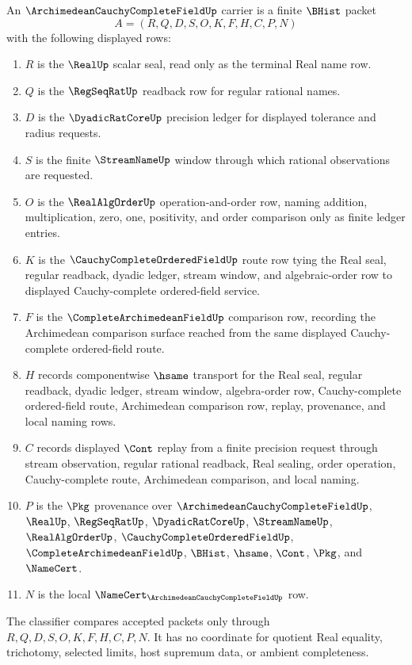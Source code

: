 \begin{definition}
\label{def:archimedean-cauchy-complete-field-carrier}
An $\ArchimedeanCauchyCompleteFieldUp$ carrier is a finite $\BHist$ packet
$$
A=(R,Q,D,S,O,K,F,H,C,P,N)
$$
with the following displayed rows:
\begin{enumerate}
\item $R$ is the $\RealUp$ scalar seal, read only as the terminal Real name row.
\item $Q$ is the $\RegSeqRatUp$ readback row for regular rational names.
\item $D$ is the $\DyadicRatCoreUp$ precision ledger for displayed tolerance and radius requests.
\item $S$ is the finite $\StreamNameUp$ window through which rational observations are requested.
\item $O$ is the $\RealAlgOrderUp$ operation-and-order row, naming addition, multiplication, zero, one, positivity, and order comparison only as finite ledger entries.
\item $K$ is the $\CauchyCompleteOrderedFieldUp$ route row tying the Real seal, regular readback, dyadic ledger, stream window, and algebraic-order row to displayed Cauchy-complete ordered-field service.
\item $F$ is the $\CompleteArchimedeanFieldUp$ comparison row, recording the Archimedean comparison surface reached from the same displayed Cauchy-complete ordered-field route.
\item $H$ records componentwise $\hsame$ transport for the Real seal, regular readback, dyadic ledger, stream window, algebra-order row, Cauchy-complete ordered-field route, Archimedean comparison row, replay, provenance, and local naming rows.
\item $C$ records displayed $\Cont$ replay from a finite precision request through stream observation, regular rational readback, Real sealing, order operation, Cauchy-complete route, Archimedean comparison, and local naming.
\item $P$ is the $\Pkg$ provenance over $\ArchimedeanCauchyCompleteFieldUp$, $\RealUp$, $\RegSeqRatUp$, $\DyadicRatCoreUp$, $\StreamNameUp$, $\RealAlgOrderUp$, $\CauchyCompleteOrderedFieldUp$, $\CompleteArchimedeanFieldUp$, $\BHist$, $\hsame$, $\Cont$, $\Pkg$, and $\NameCert$.
\item $N$ is the local $\NameCert_{\ArchimedeanCauchyCompleteFieldUp}$ row.
\end{enumerate}
The classifier compares accepted packets only through $R,Q,D,S,O,K,F,H,C,P,N$. It has no coordinate for quotient Real equality, trichotomy, selected limits, host supremum data, or ambient completeness.
\end{definition}

